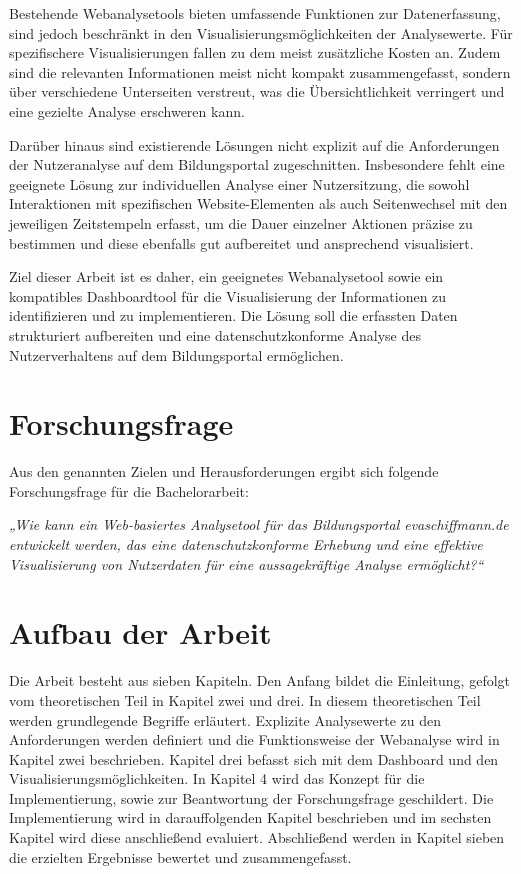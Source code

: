 Bestehende Webanalysetools bieten umfassende Funktionen zur Datenerfassung, sind jedoch beschränkt in den Visualisierungsmöglichkeiten der Analysewerte. Für spezifischere Visualisierungen fallen zu dem meist zusätzliche Kosten an. Zudem sind die relevanten Informationen meist nicht kompakt zusammengefasst, sondern über verschiedene Unterseiten verstreut, was die Übersichtlichkeit verringert und eine gezielte Analyse erschweren kann.

Darüber hinaus sind existierende Lösungen nicht explizit auf die Anforderungen der Nutzeranalyse auf dem Bildungsportal zugeschnitten. Insbesondere fehlt eine geeignete Lösung zur individuellen Analyse einer Nutzersitzung, die sowohl Interaktionen mit spezifischen Website-Elementen als auch Seitenwechsel mit den jeweiligen Zeitstempeln erfasst, um die Dauer einzelner Aktionen präzise zu bestimmen und diese ebenfalls gut aufbereitet und ansprechend visualisiert.

Ziel dieser Arbeit ist es daher, ein geeignetes Webanalysetool sowie ein kompatibles Dashboardtool für die Visualisierung der Informationen zu identifizieren und zu implementieren. Die Lösung soll die erfassten Daten strukturiert aufbereiten und eine datenschutzkonforme Analyse des Nutzerverhaltens auf dem Bildungsportal ermöglichen.

\section{Forschungsfrage}
\label{sec:forschungsfrage}
Aus den genannten Zielen und Herausforderungen ergibt sich folgende Forschungsfrage für die Bachelorarbeit:

\textit{„Wie kann ein Web-basiertes Analysetool für das Bildungsportal \textit{evaschiffmann.de} entwickelt werden, das eine datenschutzkonforme Erhebung und eine effektive Visualisierung von Nutzerdaten für eine aussagekräftige Analyse ermöglicht?“}

\section{Aufbau der Arbeit}
\label{sec:aufbau}
Die Arbeit besteht aus sieben Kapiteln. Den Anfang bildet die Einleitung, gefolgt vom theoretischen Teil in Kapitel zwei und drei. In diesem theoretischen Teil werden grundlegende Begriffe erläutert. Explizite Analysewerte zu den Anforderungen werden definiert und die Funktionsweise der Webanalyse wird in Kapitel zwei beschrieben. Kapitel drei befasst sich mit dem Dashboard und den Visualisierungsmöglichkeiten. In Kapitel 4 wird das Konzept für die Implementierung, sowie zur Beantwortung der Forschungsfrage geschildert. Die Implementierung wird in darauffolgenden Kapitel beschrieben und im sechsten Kapitel wird diese anschließend evaluiert. Abschließend werden in Kapitel sieben die erzielten Ergebnisse bewertet und zusammengefasst.